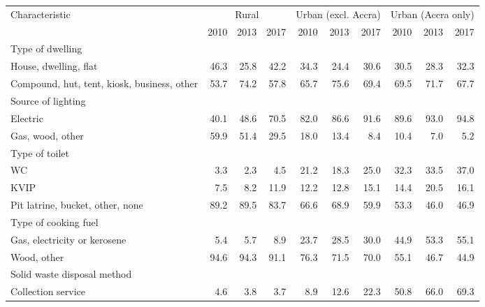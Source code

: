 \begin{tabular}{l r r r r r r r r r}
\toprule
Characteristic & \multicolumn{3}{c}{Rural} & \multicolumn{3}{c}{Urban (excl. Accra)} & \multicolumn{3}{c}{Urban (Accra only)} \\
\cmidrule(lr){2-4}
\cmidrule(lr){5-7}
\cmidrule(lr){8-10}
& 2010 & 2013 & 2017 & 2010 & 2013 & 2017 & 2010 & 2013 & 2017 \\
\midrule
Type of dwelling &&&&&&&&&\\
\hspace{6mm} House, dwelling, flat  &  46.3  &  25.8  &  42.2  &  34.3  &  24.4  &  30.6  &  30.5  &  28.3  &  32.3 \\
\hspace{6mm} Compound, hut, tent, kiosk, business, other  &  53.7  &  74.2  &  57.8  &  65.7  &  75.6  &  69.4  &  69.5  &  71.7  &  67.7 \\
Source of lighting &&&&&&&&&\\
\hspace{6mm} Electric  &  40.1  &  48.6  &  70.5  &  82.0  &  86.6  &  91.6  &  89.6  &  93.0  &  94.8 \\
\hspace{6mm} Gas, wood, other  &  59.9  &  51.4  &  29.5  &  18.0  &  13.4  &  8.4  &  10.4  &  7.0  &  5.2 \\
Type of toilet &&&&&&&&&\\
\hspace{6mm} WC  &  3.3  &  2.3  &  4.5  &  21.2  &  18.3  &  25.0  &  32.3  &  33.5  &  37.0 \\
\hspace{6mm} KVIP  &  7.5  &  8.2  &  11.9  &  12.2  &  12.8  &  15.1  &  14.4  &  20.5  &  16.1 \\
\hspace{6mm} Pit latrine, bucket, other, none  &  89.2  &  89.5  &  83.7  &  66.6  &  68.9  &  59.9  &  53.3  &  46.0  &  46.9 \\
Type of cooking fuel &&&&&&&&&\\
\hspace{6mm} Gas, electricity or kerosene  &  5.4  &  5.7  &  8.9  &  23.7  &  28.5  &  30.0  &  44.9  &  53.3  &  55.1 \\
\hspace{6mm} Wood, other  &  94.6  &  94.3  &  91.1  &  76.3  &  71.5  &  70.0  &  55.1  &  46.7  &  44.9 \\
Solid waste disposal method &&&&&&&&&\\
\hspace{6mm} Collection service  &  4.6  &  3.8  &  3.7  &  8.9  &  12.6  &  22.3  &  50.8  &  66.0  &  69.3 \\

\end{tabular}
